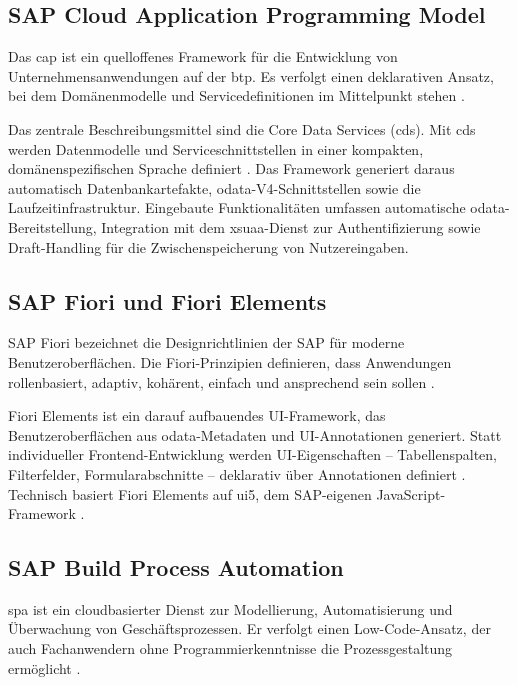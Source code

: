 \subsection{SAP Cloud Application Programming Model}
\label{subsec:cap}

Das \gls{cap} ist ein quelloffenes Framework für die Entwicklung von Unternehmensanwendungen auf der \gls{btp}. Es verfolgt einen deklarativen Ansatz, bei dem Domänenmodelle und Servicedefinitionen im Mittelpunkt stehen \citep{sap2024cap}.

Das zentrale Beschreibungsmittel sind die Core Data Services (\gls{cds}). Mit \gls{cds} werden Datenmodelle und Serviceschnittstellen in einer kompakten, domänenspezifischen Sprache definiert \citep{sap2024capguide}. Das Framework generiert daraus automatisch Datenbankartefakte, \gls{odata}-V4-Schnittstellen sowie die Laufzeitinfrastruktur. Eingebaute Funktionalitäten umfassen automatische \gls{odata}-Bereitstellung, Integration mit dem \gls{xsuaa}-Dienst zur Authentifizierung sowie Draft-Handling für die Zwischenspeicherung von Nutzereingaben.

\subsection{SAP Fiori und Fiori Elements}
\label{subsec:fiori}

SAP Fiori bezeichnet die Designrichtlinien der SAP für moderne Benutzeroberflächen. Die Fiori-Prinzipien definieren, dass Anwendungen rollenbasiert, adaptiv, kohärent, einfach und ansprechend sein sollen \citep{sap2024fiori}.

Fiori Elements ist ein darauf aufbauendes UI-Framework, das Benutzeroberflächen aus \gls{odata}-Metadaten und UI-Annotationen generiert. Statt individueller Frontend-Entwicklung werden UI-Eigenschaften -- Tabellenspalten, Filterfelder, Formularabschnitte -- deklarativ über Annotationen definiert \citep{sap2024fiorielem}. Technisch basiert Fiori Elements auf \gls{ui5}, dem SAP-eigenen JavaScript-Framework \citep{bavaraju2017fiori}.

\subsection{SAP Build Process Automation}
\label{subsec:sbpa}

\gls{spa} ist ein cloudbasierter Dienst zur Modellierung, Automatisierung und Überwachung von Geschäftsprozessen. Er verfolgt einen Low-Code-Ansatz, der auch Fachanwendern ohne Programmierkenntnisse die Prozessgestaltung ermöglicht \citep{sap2024sbpa}.

